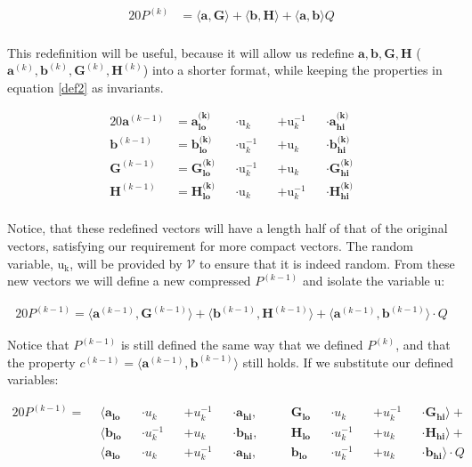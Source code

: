 \documentclass{article}
\newcommand{\eq}[1]{\begin{alignat*}{20}#1\end{alignat*}}
\renewcommand{\vec}[1]{\boldsymbol{#1}}
\newcommand{\ran}[1]{\mathrm{#1}}
\newcommand{\V}{\mathcal{V}}
\newcommand{\dotp}[2]{\langle #1, #2 \rangle}
\newcommand{\opn}[1]{\operatorname{#1}}
\newcommand{\veclo}[1]{\vec{#1_{\opn{lo}}}}
\newcommand{\vechi}[1]{\vec{#1_{\opn{hi}}}}
\begin{document}
\eq{
	P^{(k)} &= \dotp{\vec{a}}{\vec{G}} +
	           \dotp{\vec{b}}{\vec{H}} +
	           \dotp{\vec{a}}{\vec{b}}Q \\
} 

This redefinition will be useful, because it will allow us redefine
$\vec{a}, \vec{b}, \vec{G}, \vec{H}$ ($\vec{a}^{(k)}, \vec{b}^{(k)},
\vec{G}^{(k)}, \vec{H}^{(k)}$) into a shorter format, while keeping the
properties in equation \ref{def2} as invariants.

\eq{
	\vec{a}^{(k-1)} &= \veclo{a^{\text{(k)}}} &&\cdot \ran{u}_k      &&+ \ran{u}^{-1}_k &&\cdot \vechi{a^{\text{(k)}}} \\
	\vec{b}^{(k-1)} &= \veclo{b^{\text{(k)}}} &&\cdot \ran{u}^{-1}_k &&+ \ran{u}_k      &&\cdot \vechi{b^{\text{(k)}}} \\
	\vec{G}^{(k-1)} &= \veclo{G^{\text{(k)}}} &&\cdot \ran{u}^{-1}_k &&+ \ran{u}_k      &&\cdot \vechi{G^{\text{(k)}}} \\
	\vec{H}^{(k-1)} &= \veclo{H^{\text{(k)}}} &&\cdot \ran{u}_k      &&+ \ran{u}^{-1}_k &&\cdot \vechi{H^{\text{(k)}}} \\
}

Notice, that these redefined vectors will have a length half of that
of the original vectors, satisfying our requirement for more compact
vectors. The random variable, $\ran{u_k}$, will be provided by $\V$
to ensure that it is indeed random. From these new vectors we will
define a new compressed $P^{(k-1)}$ and isolate the variable $\ran{u}$:

\eq{
	P^{(k-1)} =
	\dotp{\vec{a}^{(k-1)}}{\vec{G}^{(k-1)}} +
	\dotp{\vec{b}^{(k-1)}}{\vec{H}^{(k-1)}} +
	\dotp{\vec{a}^{(k-1)}}{\vec{b}^{(k-1)}} \cdot Q
}

Notice that $P^{(k-1)}$ is still defined the same way
that we defined $P^{(k)}$, and that the property $c^{(k-1)} =
\dotp{\vec{a}^{(k-1)}}{\vec{b}^{(k-1)}}$ still holds. If we substitute
our defined variables:

\eq{
	P^{(k-1)} = \: \:
	&\dotp
		{        \veclo{a} &&\cdot u_k      &&+ u_k^{-1} &&\cdot \vechi{a}}
		{&&\quad \veclo{G} &&\cdot u_k      &&+ u_k^{-1} &&\cdot \vechi{G}}
	+ \\
	&\dotp
		{        \veclo{b} &&\cdot u_k^{-1} &&+ u_k      &&\cdot \vechi{b}}
		{&&\quad \veclo{H} &&\cdot u_k^{-1} &&+ u_k      &&\cdot \vechi{H}}
	+ \\
	&\dotp
		{        \veclo{a} &&\cdot u_k      &&+ u_k^{-1} &&\cdot \vechi{a}}
		{&&\quad \veclo{b} &&\cdot u_k^{-1} &&+ u_k      &&\cdot \vechi{b}}
	\cdot Q \\
}
\end{document}
